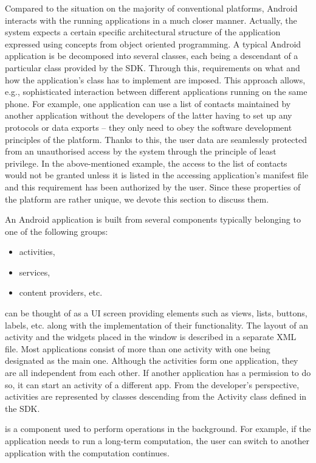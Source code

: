 Compared to the situation on the majority of conventional platforms, Android interacts with the running applications in a much closer manner. 
Actually, the system expects a certain specific architectural structure of the application expressed using concepts from object oriented programming. 
A typical Android application is be decomposed into several classes, each being a descendant of a particular class provided by the SDK. 
Through this, requirements on what and how the application's class has to implement are imposed. 
This approach allows, e.g., sophisticated interaction between different applications running on the same phone. 
For example, one application can use a list of contacts maintained by another application without the developers of the latter having to set up any protocols or data exports -- they only need to obey the software development principles of the platform. 
Thanks to this, the user data are seamlessly protected from an unauthorised access by the system through the principle of least privilege. 
In the above-mentioned example, the access to the list of contacts would not be granted unless it is listed in the accessing application's manifest file and this requirement has been authorized by the user. 
Since these properties of the platform are rather unique, we devote this section to discuss them. 

An Android application is built from several components typically belonging to one of the following groups: 
\begin{itemize}
\item{activities,}
\item{services,}
\item{content providers, etc.}
\end{itemize}

 can be thought of as a UI screen providing elements such as views, lists, buttons, labels, etc. along with the implementation of their functionality.
The layout of an activity and the widgets placed in the window is described in a separate XML file. 
Most applications consist of more than one activity with one being designated as the main one.
Although the activities form one application, they are all independent from each other.
If another application has a permission to do so, it can start an activity of a different app.
From the developer's perspective, activities are represented by classes descending from the Activity class defined in the SDK. 

 is a component used to perform operations in the background.
For example, if the application needs to run a long-term computation, the user can switch to another application with the computation continues. 

